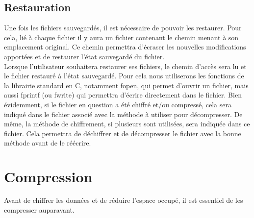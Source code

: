     \subsection{Restauration}
    Une fois les fichiers sauvegardés, il est nécessaire de pouvoir les restaurer. Pour cela, lié à chaque fichier il y aura un fichier contenant le chemin menant à son emplacement original. Ce chemin permettra d'écraser les nouvelles modifications apportées et de restaurer l'état sauvegardé du fichier. \\
    Lorsque l'utilisateur souhaitera restaurer ses fichiers, le chemin d'accès sera lu et le fichier restauré à l'état sauvegardé. Pour cela nous utiliserons les fonctions de la librairie standard en C, notamment fopen, qui permet d'ouvrir un fichier, mais aussi fprintf (ou fwrite) qui permettra d'écrire directement dans le fichier.
    Bien évidemment, si le fichier en question a été chiffré et/ou compressé, cela sera indiqué dans le fichier associé avec la méthode à utiliser pour décompresser. De même, la méthode de chiffrement, si plusieurs sont utilisées, sera indiquée dans ce fichier. Cela permettra de déchiffrer et de décompresser le fichier avec la bonne méthode avant de le réécrire.
        
\newpage

\section{Compression}
    Avant de chiffrer les données et de réduire l'espace occupé, il est essentiel de les compresser auparavant.
    
